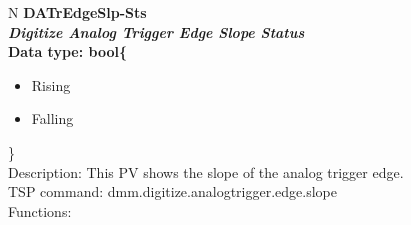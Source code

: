 \documentclass[openany]{article}
\begin{document}
		\begin{tabular}{N}
			\hline
			\bfseries DATrEdgeSlp-Sts\label{pv:datredgeslp-sts} \\ \hline
			\emph{Digitize Analog Trigger Edge Slope Status} \\
			Data type: bool\{\begin{itemize}[noitemsep]
				\small
				\item[] Rising
				\item[] Falling
			\end{itemize}\} \\
			Description: This PV shows the slope of the analog trigger edge. \\
			TSP command: dmm.digitize.analogtrigger.edge.slope \\
			Functions: \\
			\arrayrulecolor{\FuncTableBorderColor}

		\end{tabular}
\end{document}
